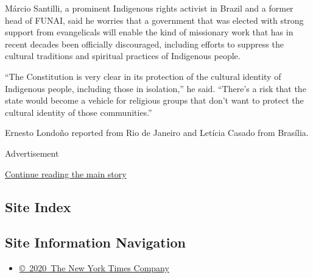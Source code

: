 Márcio Santilli, a prominent Indigenous rights activist in Brazil and a
former head of FUNAI, said he worries that a government that was elected
with strong support from evangelicals will enable the kind of missionary
work that has in recent decades been officially discouraged, including
efforts to suppress the cultural traditions and spiritual practices of
Indigenous people.

``The Constitution is very clear in its protection of the cultural
identity of Indigenous people, including those in isolation,'' he said.
``There's a risk that the state would become a vehicle for religious
groups that don't want to protect the cultural identity of those
communities.''

Ernesto Londoño reported from Rio de Janeiro and Letícia Casado from
Brasília.

Advertisement

\protect\hyperlink{after-bottom}{Continue reading the main story}

\hypertarget{site-index}{%
\subsection{Site Index}\label{site-index}}

\hypertarget{site-information-navigation}{%
\subsection{Site Information
Navigation}\label{site-information-navigation}}

\begin{itemize}
\tightlist
\item
  \href{https://help.nytimes3xbfgragh.onion/hc/en-us/articles/115014792127-Copyright-notice}{©~2020~The
  New York Times Company}
\end{itemize}


